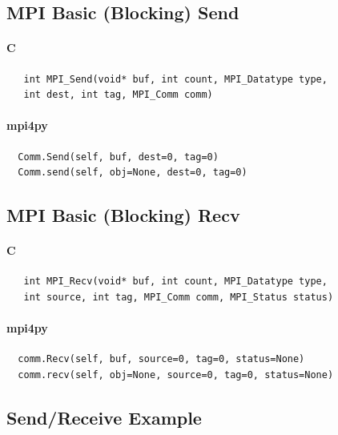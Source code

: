 \documentclass{article}
\begin{document}
    \subsection{MPI Basic (Blocking) Send}\label{mpi-basic-blocking-send}

\paragraph{C}\label{c}

\begin{verbatim}
   int MPI_Send(void* buf, int count, MPI_Datatype type, 
   int dest, int tag, MPI_Comm comm)
\end{verbatim}

\paragraph{mpi4py}\label{mpi4py}

\begin{verbatim}
  Comm.Send(self, buf, dest=0, tag=0)
  Comm.send(self, obj=None, dest=0, tag=0)
\end{verbatim}

    \subsection{MPI Basic (Blocking) Recv}\label{mpi-basic-blocking-recv}

\paragraph{C}\label{c}

\begin{verbatim}
   int MPI_Recv(void* buf, int count, MPI_Datatype type, 
   int source, int tag, MPI_Comm comm, MPI_Status status)
\end{verbatim}

\paragraph{mpi4py}\label{mpi4py}

\begin{verbatim}
  comm.Recv(self, buf, source=0, tag=0, status=None)
  comm.recv(self, obj=None, source=0, tag=0, status=None)
\end{verbatim}

    \subsection{Send/Receive Example}\label{sendreceive-example}
\end{document}
